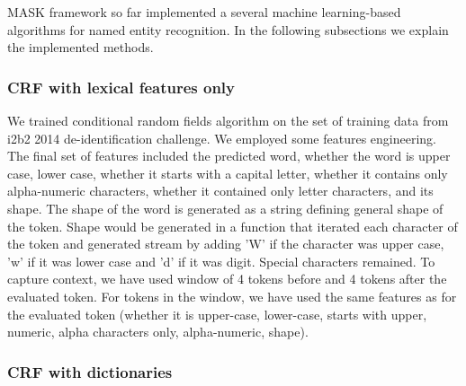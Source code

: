 \documentclass[a4paper,twoside]{article}
\begin{document}
MASK framework so far implemented a several machine learning-based algorithms for named entity recognition. In the following subsections we explain the implemented methods. 

\subsubsection{CRF with lexical features only}

We trained conditional random fields algorithm on the set of training data from i2b2 2014 de-identification challenge. We employed some features engineering. The final set of features included the predicted word, whether the word is upper case, lower case, whether it starts with a capital letter, whether it contains only alpha-numeric characters, whether it contained only letter characters, and its shape. The shape of the word is generated as a string defining general shape of the token. Shape would be generated in a function that iterated each character of the token and generated stream by adding 'W' if the character was upper case, 'w' if it was lower case and 'd' if it was digit. Special characters remained. To capture context, we have used window of 4 tokens before and 4 tokens after the evaluated token. For tokens in the window, we have used the same features as for the evaluated token (whether it is upper-case, lower-case, starts with upper, numeric, alpha characters only, alpha-numeric, shape). 


\subsubsection{CRF with dictionaries}
\end{document}
